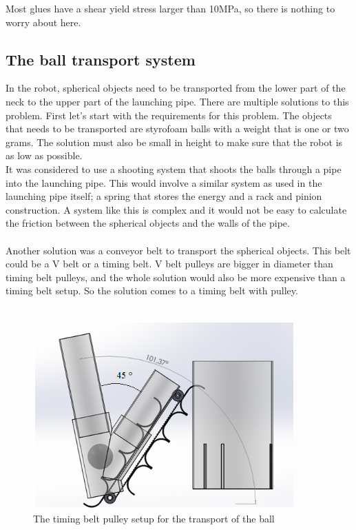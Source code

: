 \documentclass[11pt,twoside,a4paper]{report}
\begin{document}
Most glues have a shear yield stress larger than 10MPa, so there is nothing to worry about here.




\subsection{The ball transport system}
In the robot, spherical objects need to be transported from the lower part of the neck to the upper part of the launching pipe. There are multiple solutions to this problem. First let\rq{}s start with the requirements for this problem. The objects that needs to be transported are styrofoam balls with a weight that is one or two grams. The solution must also be small in height to make sure that the robot is as low as possible.  \\
It was considered to use a shooting system that shoots the balls through a pipe into the launching pipe. This would involve a similar system as used in the launching pipe itself; a spring that stores the energy and a rack and pinion construction. A system like this is complex and it would not be easy to calculate the friction between the spherical objects and the walls of the pipe.\\
\\
Another solution was a conveyor belt to transport the spherical objects. This belt could be a V belt or a timing belt. V belt pulleys are bigger in diameter than timing belt pulleys, and the whole solution would also be more expensive than a timing belt setup. So the solution comes to a timing belt with pulley.\\
\\
\begin{figure}[H]
\begin{center}
\includegraphics[width = 10cm]{Images/Ball_transport_system.png}
\caption{The timing belt pulley setup for the transport of the ball}
\label{fig:balltransport}
\end{center}
\end{figure}
\end{document}
